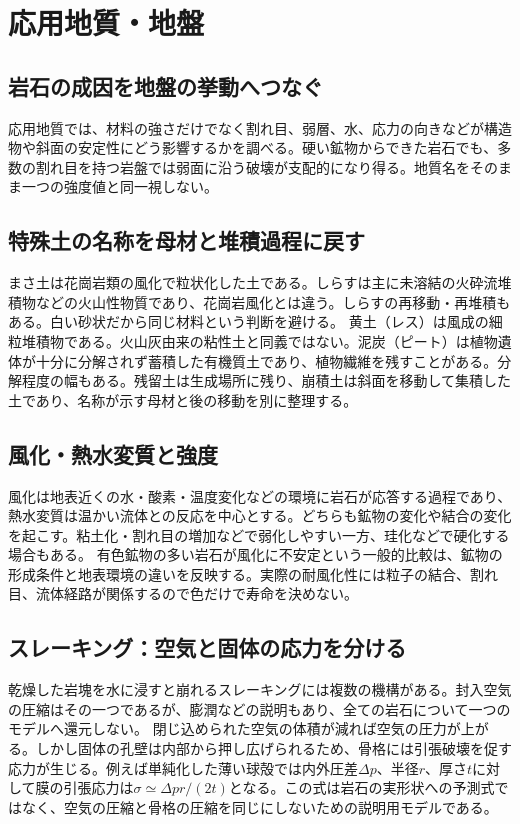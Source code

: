 \chapter{応用地質・地盤}
\section{岩石の成因を地盤の挙動へつなぐ}
応用地質では、材料の強さだけでなく割れ目、弱層、水、応力の向きなどが構造物や斜面の安定性にどう影響するかを調べる。硬い鉱物からできた岩石でも、多数の割れ目を持つ岩盤では弱面に沿う破壊が支配的になり得る。地質名をそのまま一つの強度値と同一視しない。

\section{特殊土の名称を母材と堆積過程に戻す}
\label{theory:engineering:soil}
まさ土は花崗岩類の風化で粒状化した土である\cite{mlit_masa}。しらすは主に未溶結の火砕流堆積物などの火山性物質であり、花崗岩風化とは違う。しらすの再移動・再堆積もある\cite{maff_shiras2017,gsj_shiras1957}。白い砂状だから同じ材料という判断を避ける。
黄土（レス）は風成の細粒堆積物である\cite{gsj_loess2002,loess2003}。火山灰由来の粘性土と同義ではない。泥炭（ピート）は植物遺体が十分に分解されず蓄積した有機質土であり、植物繊維を残すことがある\cite{mlit_peat}。分解程度の幅もある。残留土は生成場所に残り、崩積土は斜面を移動して集積した土であり、名称が示す母材と後の移動を別に整理する。

\section{風化・熱水変質と強度}
\label{theory:engineering:weathering}
風化は地表近くの水・酸素・温度変化などの環境に岩石が応答する過程であり、熱水変質は温かい流体との反応を中心とする。どちらも鉱物の変化や結合の変化を起こす。粘土化・割れ目の増加などで弱化しやすい一方、珪化などで硬化する場合もある\cite{jseg_engineering_faq}。
有色鉱物の多い岩石が風化に不安定という一般的比較は、鉱物の形成条件と地表環境の違いを反映する。実際の耐風化性には粒子の結合、割れ目、流体経路が関係するので色だけで寿命を決めない。

\section{スレーキング：空気と固体の応力を分ける}
\label{theory:engineering:slaking}
乾燥した岩塊を水に浸すと崩れるスレーキングには複数の機構がある。封入空気の圧縮はその一つであるが、膨潤などの説明もあり、全ての岩石について一つのモデルへ還元しない\cite{slaking1979,slaking2006}。
閉じ込められた空気の体積が減れば空気の圧力が上がる。しかし固体の孔壁は内部から押し広げられるため、骨格には引張破壊を促す応力が生じる。例えば単純化した薄い球殻では内外圧差\(\Delta p\)、半径\(r\)、厚さ\(t\)に対して膜の引張応力は\(\sigma\simeq\Delta p r/(2t)\)となる。この式は岩石の実形状への予測式ではなく、空気の圧縮と骨格の圧縮を同じにしないための説明用モデルである。

